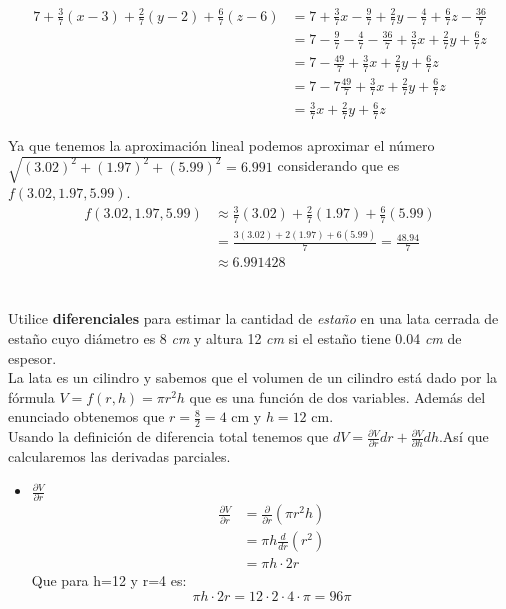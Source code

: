 \documentclass[12pt]{article}
\begin{document}
\begin{itemize}[format=\textbf]
\begin{align*}
  7 + \frac{3}{7}(x-3)+ \frac{2}{7}(y-2) +  \frac{6}{7}(z-6) &=
  7 + \frac{3}{7}x-\frac{9}{7}+ \frac{2}{7}y-  \frac{4}{7} +  \frac{6}{7}z-   \frac{36}{7} \\
  &= 7 -\frac{9}{7}-  \frac{4}{7} -   \frac{36}{7} +\frac{3}{7}x + \frac{2}{7}y+  \frac{6}{7}z \\
  &=  7 -\frac{49}{7}+\frac{3}{7}x + \frac{2}{7}y+  \frac{6}{7}z\\
  &=  7 -7\frac{49}{7}+\frac{3}{7}x + \frac{2}{7}y+  \frac{6}{7}z\\
  &= \frac{3}{7}x + \frac{2}{7}y+  \frac{6}{7}z
\end{align*}

Ya que tenemos la aproximación lineal podemos aproximar el número $\sqrt{(3.02)^2+(1.97)^2+(5.99)^2} = 6.991$ considerando que es $f(3.02, 1.97,5.99)$.
\begin{align*}
  f(3.02, 1.97,5.99) &\approx \frac{3}{7}(3.02) + \frac{2}{7}(1.97) +  \frac{6}{7}(5.99)\\
  & =\frac{3(3.02) + 2(1.97) + 6(5.99)}{7} = \frac{48.94}{7} \\
  &\approx 6.991428
\end{align*}




\section{}

Utilice \textbf{diferenciales} para estimar la cantidad de \textit{estaño} en una lata cerrada de estaño cuyo diámetro es 8 \textit{cm} y altura 12 \textit{cm} si el estaño tiene
0.04 \textit{cm} de espesor.\\
La lata es un cilindro y sabemos que el volumen de un cilindro está dado por la fórmula $V =f(r,h) = \pi r^2 h$ que es una función de dos variables. Además del enunciado obtenemos que $r=\frac{8}{2} = 4$ cm y $h=12$ cm.\\

Usando la definición de diferencia total tenemos que $dV = \frac{\partial V}{\partial r}dr + \frac{\partial V}{\partial h}dh$.Así que calcularemos las derivadas parciales.\\

\begin{itemize}
\item $\frac{\partial V}{\partial r}$ \\
  \begin{align*}
    \frac{\partial V}{\partial r}
    &=  \frac{\partial}{\partial r} \left( \pi r^2 h \right) \\
    &=  \pi h \frac{d}{d r}(r^2) \\
    &= \pi h \cdot 2r
  \end{align*}
  Que para h=12 y r=4 es:$$ \pi h \cdot 2r = 12 \cdot 2\cdot 4\cdot \pi = 96 \pi $$
  

\end{itemize}
\end{itemize}
\end{document}
